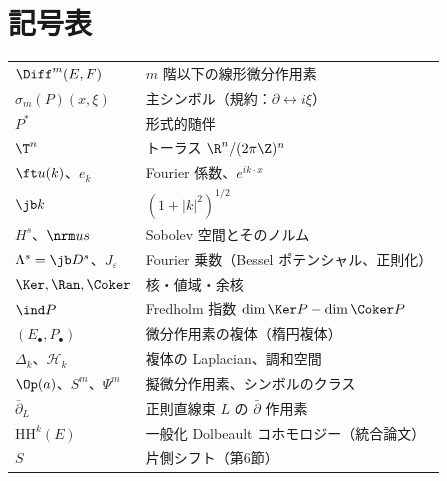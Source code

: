 \section*{記号表}
\begin{tabular}{lp{10cm}}
$\Diff^m(E,F)$ & $m$ 階以下の線形微分作用素\\
$\sigma_m(P)(x,\xi)$ & 主シンボル（規約：$\partial\leftrightarrow i\xi$）\\
$P^*$ & 形式的随伴\\
$\T^n$ & トーラス $\R^n/(2\pi\Z)^n$\\
$\ft u(k)$、$e_k$ & Fourier 係数、$e^{ik\cdot x}$\\
$\jb k$ & $(1+|k|^2)^{1/2}$\\
$H^s$、$\nrm us$ & Sobolev 空間とそのノルム\\
$\Lambda^s=\jb D^s$、$J_\varepsilon$ & Fourier 乗数（Bessel ポテンシャル、正則化）\\
$\Ker,\Ran,\Coker$ & 核・値域・余核\\
$\ind P$ & Fredholm 指数 $\dim\Ker P-\dim\Coker P$\\
$(E_\bullet,P_\bullet)$ & 微分作用素の複体（楕円複体）\\
$\Delta_k$、$\mathcal H_k$ & 複体の Laplacian、調和空間\\
$\Op(a)$、$S^m$、$\Psi^m$ & 擬微分作用素、シンボルのクラス\\
$\bar\partial_L$ & 正則直線束 $L$ の $\bar\partial$ 作用素\\
$\mathrm{HH}^k(E)$ & 一般化 Dolbeault コホモロジー（統合論文）\\
$S$ & 片側シフト（第6節）\\
\end{tabular}

